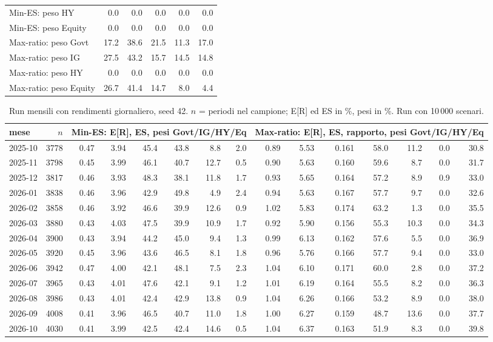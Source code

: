 \begin{table}[htbp]
\begin{tabular}{lrrrrr}
Min-ES: peso HY & 0.0 & 0.0 & 0.0 & 0.0 & 0.0 \\
Min-ES: peso Equity & 0.0 & 0.0 & 0.0 & 0.0 & 0.0 \\
Max-ratio: peso Govt & 17.2 & 38.6 & 21.5 & 11.3 & 17.0 \\
Max-ratio: peso IG & 27.5 & 43.2 & 15.7 & 14.5 & 14.8 \\
Max-ratio: peso HY & 0.0 & 0.0 & 0.0 & 0.0 & 0.0 \\
Max-ratio: peso Equity & 26.7 & 41.4 & 14.7 & 8.0 & 4.4 \\
\bottomrule\end{tabular}\end{table}

\begin{table}[htbp]\centering\scriptsize\setlength{\tabcolsep}{3.5pt}
\caption{Run mensili con rendimenti giornaliero, seed 42. $n$ = periodi nel campione; E[R] ed ES in \%, pesi in \%. Run con 10\,000 scenari.}\label{tab:runs_daily_10k}
\begin{tabular}{lrrrrrrrrrrrrrr}\toprule
mese & $n$ & \multicolumn{6}{c}{Min-ES: E[R], ES, pesi Govt/IG/HY/Eq} & \multicolumn{7}{c}{Max-ratio: E[R], ES, rapporto, pesi Govt/IG/HY/Eq} \\\midrule
2025-10 & 3778 & 0.47 & 3.94 & 45.4 & 43.8 & 8.8 & 2.0 & 0.89 & 5.53 & 0.161 & 58.0 & 11.2 & 0.0 & 30.8 \\
2025-11 & 3798 & 0.45 & 3.99 & 46.1 & 40.7 & 12.7 & 0.5 & 0.90 & 5.63 & 0.160 & 59.6 & 8.7 & 0.0 & 31.7 \\
2025-12 & 3817 & 0.46 & 3.93 & 48.3 & 38.1 & 11.8 & 1.7 & 0.93 & 5.65 & 0.164 & 57.2 & 8.9 & 0.9 & 33.0 \\
2026-01 & 3838 & 0.46 & 3.96 & 42.9 & 49.8 & 4.9 & 2.4 & 0.94 & 5.63 & 0.167 & 57.7 & 9.7 & 0.0 & 32.6 \\
2026-02 & 3858 & 0.46 & 3.92 & 46.6 & 39.9 & 12.6 & 0.9 & 1.02 & 5.83 & 0.174 & 63.2 & 1.3 & 0.0 & 35.5 \\
2026-03 & 3880 & 0.43 & 4.03 & 47.5 & 39.9 & 10.9 & 1.7 & 0.92 & 5.90 & 0.156 & 55.3 & 10.3 & 0.0 & 34.3 \\
2026-04 & 3900 & 0.43 & 3.94 & 44.2 & 45.0 & 9.4 & 1.3 & 0.99 & 6.13 & 0.162 & 57.6 & 5.5 & 0.0 & 36.9 \\
2026-05 & 3920 & 0.45 & 3.96 & 43.6 & 46.5 & 8.1 & 1.8 & 0.96 & 5.76 & 0.166 & 57.7 & 9.4 & 0.0 & 33.0 \\
2026-06 & 3942 & 0.47 & 4.00 & 42.1 & 48.1 & 7.5 & 2.3 & 1.04 & 6.10 & 0.171 & 60.0 & 2.8 & 0.0 & 37.2 \\
2026-07 & 3965 & 0.43 & 4.01 & 47.6 & 42.1 & 9.1 & 1.2 & 1.01 & 6.19 & 0.164 & 55.5 & 8.2 & 0.0 & 36.3 \\
2026-08 & 3986 & 0.43 & 4.01 & 42.4 & 42.9 & 13.8 & 0.9 & 1.04 & 6.26 & 0.166 & 53.2 & 8.9 & 0.0 & 38.0 \\
2026-09 & 4008 & 0.41 & 3.96 & 46.5 & 40.7 & 11.0 & 1.8 & 1.00 & 6.27 & 0.159 & 48.7 & 13.6 & 0.0 & 37.7 \\
2026-10 & 4030 & 0.41 & 3.99 & 42.5 & 42.4 & 14.6 & 0.5 & 1.04 & 6.37 & 0.163 & 51.9 & 8.3 & 0.0 & 39.8 \\
\bottomrule\end{tabular}\end{table}

